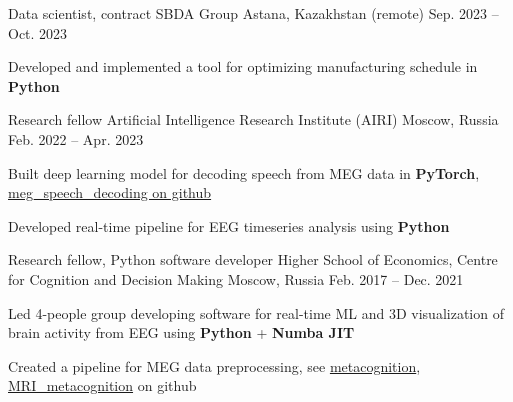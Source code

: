 
\begin{cventries}
  \cventry
    {Data scientist, contract}
    {SBDA Group}
    {Astana, Kazakhstan (remote)}
    {Sep. 2023 -- Oct. 2023}
    {
      \begin{cvitems}
          \item Developed and implemented a tool for optimizing manufacturing schedule in \textbf{Python}
      \end{cvitems}
    }
  \cventry
    {Research fellow}
    {Artificial Intelligence Research Institute (AIRI)}
    {Moscow, Russia}
    {Feb. 2022 -- Apr. 2023}
    {
      \begin{cvitems}
      \item Built deep learning model for decoding speech from MEG data in \textbf{PyTorch},
          \href{https://github.com/dmalt/meg_speech_decoding}{meg\_speech\_decoding on github}
      \item Developed real-time pipeline for EEG timeseries analysis using
          \textbf{Python}
      \end{cvitems}
    }
  \cventry
    {Research fellow, Python software developer}
    {Higher School of Economics, Centre for Cognition and Decision Making}
    {Moscow, Russia}
    {Feb. 2017 -- Dec. 2021}
    {
      \begin{cvitems}
      \item{Led 4-people group developing software for real-time ML and 3D visualization of brain activity from EEG using \textbf{Python} + \textbf{Numba JIT}}
      \item{Created a pipeline for MEG data preprocessing, see \href{https://github.com/dmalt/metacognition}{metacognition}, \href{https://github.com/dmalt/MRI_metacognition}{MRI\_metacognition}} on github
      \end{cvitems}
    }

\end{cventries}
